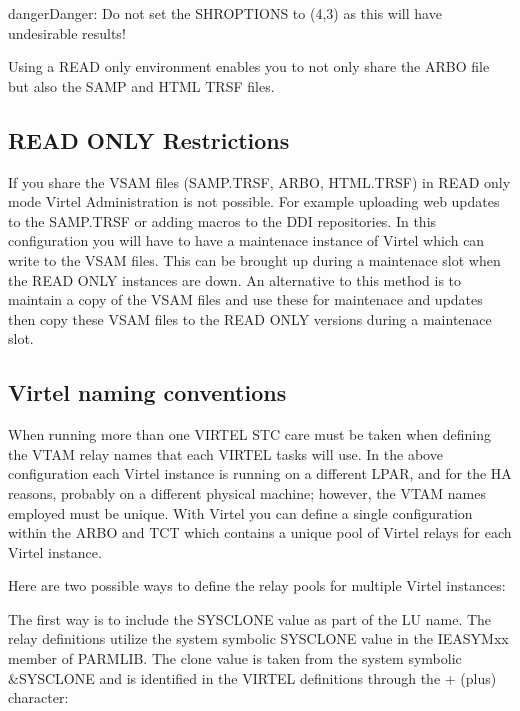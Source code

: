 \documentclass[letterpaper,10pt,english]{sphinxmanual}
\begin{document}
\begin{sphinxadmonition}{danger}{Danger:}
Do not set the SHROPTIONS to (4,3) as this will have undesirable results!
\end{sphinxadmonition}

Using a READ only environment enables you to not only share the ARBO file but also the SAMP and HTML TRSF files.


\subsection{READ ONLY Restrictions}
\label{\detokenize{connectivity_guide:read-only-restrictions}}
If you share the VSAM files (SAMP.TRSF, ARBO, HTML.TRSF) in READ only mode Virtel Administration is not possible. For example uploading web updates to the SAMP.TRSF or adding macros to the DDI repositories. In this configuration you will have to have a maintenace instance of Virtel which can write to the VSAM files. This can be brought up during a maintenace slot when the READ ONLY instances are down. An alternative to this method is to maintain a copy of the VSAM files and use these for maintenace and updates then copy these VSAM files to the READ ONLY versions during a maintenace slot.

\newpage


\subsection{Virtel naming conventions}
\label{\detokenize{connectivity_guide:virtel-naming-conventions}}
When running more than one VIRTEL STC care must be taken when defining the VTAM relay names that each VIRTEL tasks will use. In the above configuration each Virtel instance is running on a different LPAR, and for the HA reasons, probably on a different physical machine; however, the VTAM names employed must be unique. With Virtel you can define a
single configuration within the ARBO and TCT which contains a unique pool of Virtel relays for each Virtel instance.

Here are two possible ways to define the relay pools for multiple Virtel instances:

The first way is to include the SYSCLONE value as part of the LU name. The relay definitions utilize the system symbolic SYSCLONE value in the IEASYMxx member of PARMLIB. The clone value is taken from the system symbolic \&SYSCLONE and is identified in the VIRTEL definitions through the + (plus) character:
\end{document}
